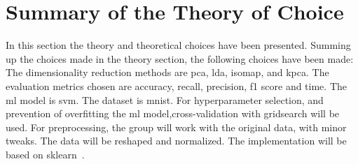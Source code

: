 \section{Summary of the Theory of Choice}\label{sec:theory-choice-summary}

In this section the theory and theoretical choices have been presented. Summing up the choices made in the theory section, the following choices have been made: The dimensionality reduction methods are \gls{pca}, \gls{lda}, \gls{isomap}, and \gls{kpca}. The evaluation metrics chosen are accuracy, recall, precision, f1 score and time. The \gls{ml} model is \gls{svm}. The dataset is \gls{mnist}. For hyperparameter selection, and prevention of overfitting the \gls{ml} model,cross-validation with gridsearch will be used. For preprocessing, the group will work with the original data, with minor tweaks. The data will be reshaped and normalized. The implementation will be based on \gls{sklearn}~\cite{scikit-learn}.
